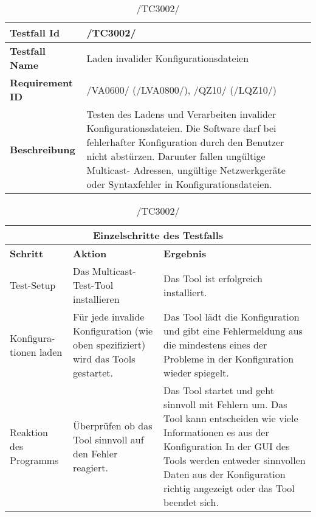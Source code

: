 \begin{table}[h]
\caption{/TC3002/}
\label{tab:TC3002}
\begin{center}
\begin{tabular}{|p{3.5cm}|p{9cm}|}
\hline
\textbf{Testfall Id} & /TC3002/\\
\hline
\textbf{Testfall Name} & Laden invalider Konfigurationsdateien \\
\hline
\textbf{Requirement ID} & /VA0600/ (/LVA0800/), /QZ10/ (/LQZ10/) \\
\hline
\textbf{Beschreibung} & Testen des Ladens und Verarbeiten invalider Konfigurationsdateien. 
Die Software darf bei fehlerhafter Konfiguration durch den
Benutzer nicht abstürzen. Darunter fallen ungültige Multicast-
Adressen, ungültige Netzwerkgeräte oder Syntaxfehler in Konfigurationsdateien.\\
\hline
\end{tabular}
\begin{tabular}{|p{2.5cm}|p{5cm}|p{4.55cm}|}
\multicolumn{3}{|c|}{\textbf{Einzelschritte des Testfalls}} \\
\hline
\textbf{Schritt} & \textbf{Aktion} & \textbf{Ergebnis}\\
\hline
Test-Setup & Das Multicast-Test-Tool installieren & Das Tool ist erfolgreich installiert. \\
\hline
Konfigura- tionen laden & Für jede invalide Konfiguration (wie oben spezifiziert) wird das Tools gestartet. & Das Tool lädt die Konfiguration und gibt eine Fehlermeldung aus die mindestens eines der Probleme in der Konfiguration wieder spiegelt.\\
\hline
Reaktion des Programms & Überprüfen ob das Tool sinnvoll auf den Fehler reagiert. & Das Tool startet und geht sinnvoll mit Fehlern um. Das Tool kann entscheiden wie viele Informationen es aus der Konfiguration In der GUI des Tools werden entweder sinnvollen Daten aus der Konfiguration richtig angezeigt oder das Tool beendet sich.\\
\hline
\end{tabular}
\end{center}
\label{default}
\end{table}

